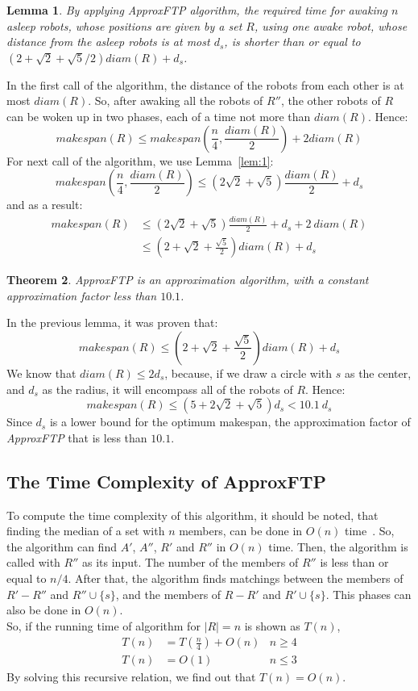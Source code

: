 \documentclass[review]{elsarticle}
\newtheorem{theorem}{Theorem}
\newtheorem{lemma}[theorem]{Lemma}
\def\QED{\ensuremath{{\square}}}
\def\markatright#1{\leavevmode\unskip\nobreak\quad\hspace*{\fill}{#1}}
\newenvironment{proof}
{\begin{trivlist}\item[\hskip\labelsep{\bf Proof.}]}
  {\markatright{\QED}\end{trivlist}}
\begin{document}
\begin{lemma}
\label{lem:2}
By applying \textit{ApproxFTP} algorithm, the required time for awaking $n$ asleep robots, whose positions are given by a set $R$, using one awake robot, whose distance from the asleep robots is at most $d_s$, is shorter than or equal to ${ (2+\sqrt{2}+\sqrt{5}/2)diam(R)+d_s }$.
\end{lemma}
\begin{proof}
In the first call of the algorithm, the distance of the robots from each other is at most $diam(R)$. So, after awaking all the robots of $R''$, the other robots of $R$ can be woken up in two phases, each of a time not more than $diam(R)$. Hence:
$$ makespan(R) \leq makespan(\frac{n}{4},\frac{diam(R)}{2})+2diam(R) $$
For next call of the algorithm, we use Lemma~\ref{lem:1}:
$$ makespan(\frac{n}{4},\frac{diam(R)}{2}) \leq (2\sqrt{2}+\!\sqrt{5})\frac{diam(R)}{2}+d_s $$
and as a result:
\begin{align}
makespan(R) &\leq (2\sqrt{2}+\!\sqrt{5})\frac{diam(R)}{2}+d_s+2~diam(R) \nonumber\\
			&\leq (2+\sqrt{2}+\frac{\sqrt{5}}{2})diam(R)+d_s \nonumber
\end{align}
\end{proof}

\begin{theorem}
\textit{ApproxFTP} is an approximation algorithm, with a constant approximation factor less than $10.1$.
\end{theorem}
\begin{proof}
In the previous lemma, it was proven that:
$$ makespan(R) \leq (2+\sqrt{2}+\frac{\sqrt{5}}{2})diam(R)+d_s $$
We know that $diam(R)\leq2d_s$, because, if we draw a circle with $s$ as the center, and $d_s$ as the radius, it will encompass all of the robots of $R$. Hence:
$$ makespan(R) \leq (5+2\sqrt{2}+\sqrt{5})d_s < 10.1~d_s $$
Since $d_s$ is a lower bound for the optimum makespan, the approximation factor of \textit{ApproxFTP} that is less than $10.1$.
\end{proof}

\subsection{The Time Complexity of ApproxFTP}
To compute the time complexity of this algorithm, it should be noted, that finding the median of a set with $n$ members, can be done in $O(n)$ time~\cite{CLRS}. So, the algorithm can find $A'$, $A''$, $R'$ and $R''$ in $O(n)$ time. Then, the algorithm is called with $R''$ as its input. The number of the members of $R''$ is less than or equal to $n/4$. After that, the algorithm finds matchings between the members of $R'-R''$ and $R''\cup\{s\}$, and the members of $R-R'$ and $R'\cup\{s\}$. This phases can also be done in $O(n)$.\\
So, if the running time of algorithm for $|R|=n$ is shown as $T(n)$,
\begin{align}
T(n)&=T(\frac{n}{4})+O(n) &n\geq 4 \nonumber\\
T(n)&=O(1) &n\leq 3 \nonumber
\end{align}
By solving this recursive relation, we find out that $T(n)=O(n)$.
\end{document}
